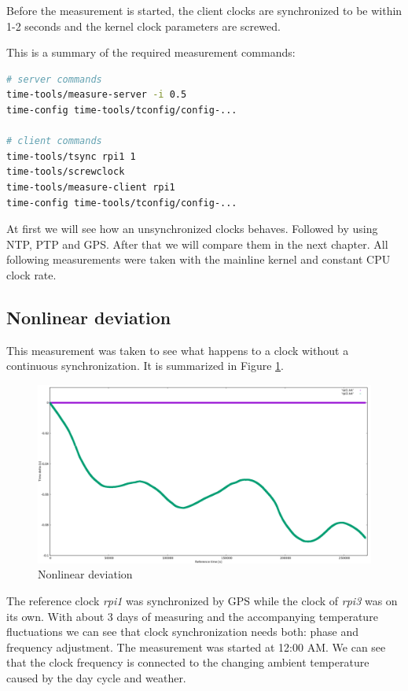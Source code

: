 Before the measurement is started, the client clocks are synchronized to be within 1-2 seconds and the kernel clock parameters are screwed.

This is a summary of the required measurement commands:

\begin{lstlisting}[language=bash]
# server commands
time-tools/measure-server -i 0.5
time-config time-tools/tconfig/config-...

# client commands
time-tools/tsync rpi1 1
time-tools/screwclock
time-tools/measure-client rpi1
time-config time-tools/tconfig/config-...
\end{lstlisting}

At first we will see how an unsynchronized clocks behaves. Followed by using NTP, PTP and GPS. After that we will compare them in the next chapter. All following measurements were taken with the mainline kernel and constant CPU clock rate.

\subsection{Nonlinear deviation}

This measurement was taken to see what happens to a clock without a continuous synchronization. It is summarized in Figure \ref{fig:plot_nonlinear}.

\begin{figure}[tb]
	\centering
	\includegraphics[width=1.0\textwidth]{figures/plot_nonlinear.png}
	\caption{Nonlinear deviation}
	\label{fig:plot_nonlinear}
\end{figure}

The reference clock \textit{rpi1} was synchronized by GPS while the clock of \textit{rpi3} was on its own. With about 3 days of measuring and the accompanying temperature fluctuations we can see that clock synchronization needs both: phase and frequency adjustment.
The measurement was started at 12:00 AM. We can see that the clock frequency is connected to the changing ambient temperature caused by the day cycle and weather.


